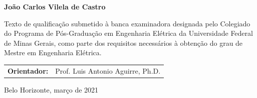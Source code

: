 \begin{titlepage}
\begin{center}
{\large \bf João Carlos Vilela de Castro}\\[0.5cm]
\end{center}


\vspace{1.75cm}
\begin{flushright}
\begin{minipage}{0.7\linewidth}
Texto de qualificação submetido à banca examinadora designada pelo Colegiado do
Programa de Pós-Graduação em Engenharia Elétrica da Universidade Federal
de Minas Gerais, como parte dos requisitos necessários à obtenção do grau
de Mestre em Engenharia Elétrica.\\
\end{minipage}
\end{flushright}
\vspace{1.6cm}




\begin{tabular}{ll}
  {\bf Orientador:} & Prof. Luis Antonio Aguirre, Ph.D.\\
\end{tabular}
\vspace{1.6cm}

\centerline{Belo Horizonte, março de 2021}
\end{titlepage}
